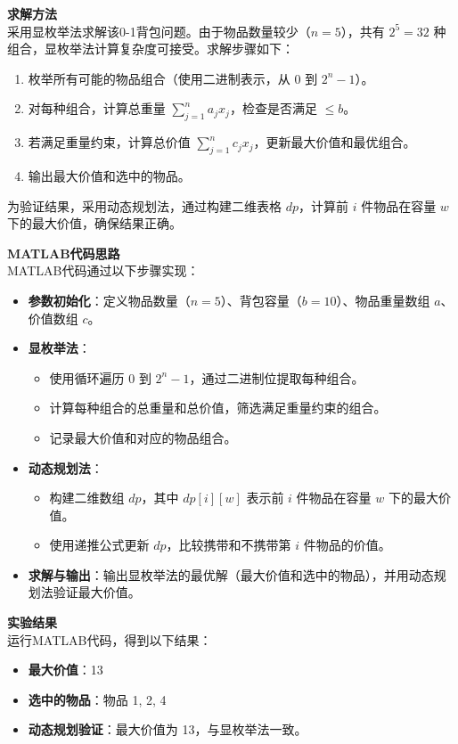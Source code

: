 \textbf{求解方法}\\
采用显枚举法求解该0-1背包问题。由于物品数量较少（\( n = 5 \)），共有 \( 2^5 = 32 \) 种组合，显枚举法计算复杂度可接受。求解步骤如下：
\begin{enumerate}
    \item 枚举所有可能的物品组合（使用二进制表示，从 \( 0 \) 到 \( 2^n - 1 \)）。
    \item 对每种组合，计算总重量 \( \sum_{j=1}^n a_j x_j \)，检查是否满足 \( \leq b \)。
    \item 若满足重量约束，计算总价值 \( \sum_{j=1}^n c_j x_j \)，更新最大价值和最优组合。
    \item 输出最大价值和选中的物品。
\end{enumerate}
为验证结果，采用动态规划法，通过构建二维表格 \( dp \)，计算前 \( i \) 件物品在容量 \( w \) 下的最大价值，确保结果正确。

\textbf{MATLAB代码思路}\\
MATLAB代码通过以下步骤实现：
\begin{itemize}
    \item \textbf{参数初始化}：定义物品数量（\( n = 5 \)）、背包容量（\( b = 10 \)）、物品重量数组 \( a \)、价值数组 \( c \)。
    \item \textbf{显枚举法}：
        \begin{itemize}
            \item 使用循环遍历 \( 0 \) 到 \( 2^n - 1 \)，通过二进制位提取每种组合。
            \item 计算每种组合的总重量和总价值，筛选满足重量约束的组合。
            \item 记录最大价值和对应的物品组合。
        \end{itemize}
    \item \textbf{动态规划法}：
        \begin{itemize}
            \item 构建二维数组 \( dp \)，其中 \( dp[i][w] \) 表示前 \( i \) 件物品在容量 \( w \) 下的最大价值。
            \item 使用递推公式更新 \( dp \)，比较携带和不携带第 \( i \) 件物品的价值。
        \end{itemize}
    \item \textbf{求解与输出}：输出显枚举法的最优解（最大价值和选中的物品），并用动态规划法验证最大价值。
\end{itemize}

\textbf{实验结果}\\
运行MATLAB代码，得到以下结果：
\begin{itemize}
    \item \textbf{最大价值}：13
    \item \textbf{选中的物品}：物品 1, 2, 4
    \item \textbf{动态规划验证}：最大价值为 13，与显枚举法一致。
\end{itemize}


